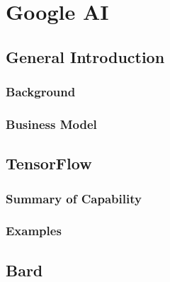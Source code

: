 \chapter{Google AI} \label{ch:googleai}

\section{General Introduction}

\subsection{Background}

\subsection{Business Model}

\section{TensorFlow}

\subsection{Summary of Capability}

\subsection{Examples}

\section{Bard}